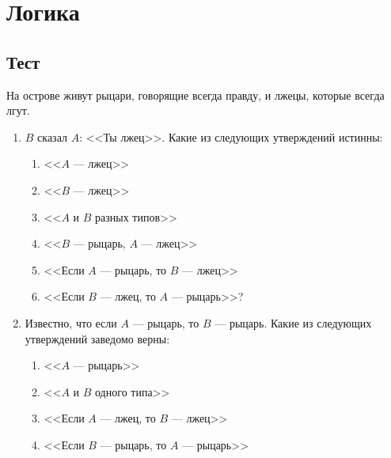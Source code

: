 
\section*{Логика}


\subsection*{Тест}

На острове живут рыцари, говорящие всегда правду, и лжецы, которые всегда лгут.

\begin{enumerate}

\item
$B$ сказал $A$: <<Ты лжец>>.
Какие из следующих утверждений истинны:

\begin{enumerate}

\item <<$A$ --- лжец>>

\item <<$B$ --- лжец>>

\item <<$A$ и $B$ разных типов>>

\item <<$B$ --- рыцарь, $A$ --- лжец>>

\item <<Если $A$ ---  рыцарь, то $B$ --- лжец>>

\item <<Если $B$ ---  лжец, то $A$ --- рыцарь>>?

\end{enumerate}

\item
Известно, что если $A$ --- рыцарь, то $B$ --- рыцарь.
Какие из следующих утверждений заведомо верны:

\begin{enumerate}

\item <<$A$ --- рыцарь>>

\item <<$A$ и $B$ одного типа>>

\item <<Если $A$ ---  лжец, то $B$ --- лжец>>

\item <<Если $B$ ---  рыцарь, то $A$ --- рыцарь>>


\end{enumerate}
\end{enumerate}
